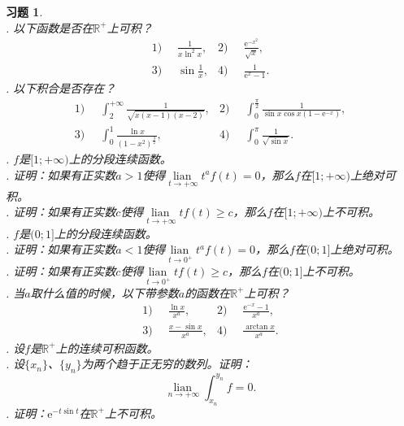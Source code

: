 \documentclass[12pt,UTF8]{ctexbook}
\newcommand{\lian}[1]{
    \underset{#1}{\operatorname{lian}\,}
}
\newcommand{\e}{\mathrm{e}}
\theoremstyle{definition}
\theoremstyle{plain}
\newtheorem{xt}{习题}[section]
\begin{document}
\begin{xt}
    \mbox{} \\
    . 以下函数是否在$\mathbb{R}^+$上可积？\\    
    \begin{align*}
        1)\;\;& \frac{1}{x\ln^2{x}} ,  &2)\;\;& \frac{\e^{-x^2}}{\sqrt{x}}, \\[3pt]
        3)\;\;& \sin{\frac{1}{x}},  & 4)\;\;& \frac{1}{\e^x  - 1}.
    \end{align*}
    . 以下积合是否存在？\\    
    \begin{align*}
        1)\;\;& \int_2^{+\infty} \frac{1}{\sqrt{x(x - 1)(x - 2)}},  &2)\;\;& \int_0^{\frac{\pi}{2}} \frac{1}{\sin{x}\cos{x}(1 - \e^{-x})}, \\[3pt]
        3)\;\;& \int_0^{1} \frac{\ln{x}}{(1 - x^2)^{\frac{3}{2}}} , & 4)\;\;& \int_0^{\pi} \frac{1}{\sqrt{\sin{x}}}.
    \end{align*}
    . $f$是$[1;+\infty)$上的分段连续函数。\\
    . 证明：如果有正实数$a>1$使得$\lian{t\to+\infty} t^a f(t) = 0$，那么$f$在$[1;+\infty)$上绝对可积。\\
    . 证明：如果有正实数$c$使得$\lian{t\to+\infty} t f(t) \geqslant c$，那么$f$在$[1;+\infty)$上不可积。\\
    . $f$是$(0;1]$上的分段连续函数。\\
    . 证明：如果有正实数$a<1$使得$\lian{t\to 0^+} t^a f(t) = 0$，那么$f$在$(0;1]$上绝对可积。\\
    . 证明：如果有正实数$c$使得$\lian{t\to 0^+} t f(t) \geqslant c$，那么$f$在$(0;1]$上不可积。\\
    . 当$a$取什么值的时候，以下带参数$a$的函数在$\mathbb{R}^+$上可积？\\
    \begin{align*}
        1)\;\;& \frac{\ln{x}}{x^a} ,  &2)\;\;& \frac{\e^{-x} - 1}{x^a}, \\[3pt]
        3)\;\;& \frac{x - \sin{x}}{x^a},  & 4)\;\;& \frac{\arctan{x}}{x^a}. 
    \end{align*}
    . 设$f$是$\mathbb{R}^+$上的连续可积函数。\\
    . 设$\{x_n\}$、$\{y_n\}$为两个趋于正无穷的数列。证明：
    $$ \lian{n\to+\infty}\int_{x_n}^{y_n} f = 0. $$
    . 证明：$\e^{-t\sin{t}}$在$\mathbb{R}^+$上不可积。

\end{xt}
\end{document}

